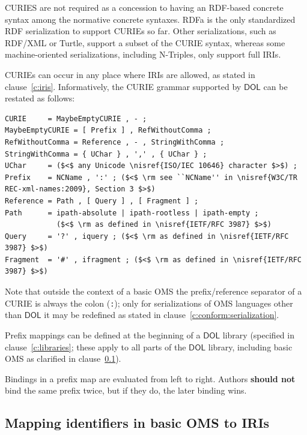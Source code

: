 \documentclass[10pt,fleqn,final]{scrreprt}
\newcommand{\cbs}[0]{\color{red}\xspace} %
\newcommand{\cbe}[0]{\color{black}\xspace} %
\newcommand*{\syntax}[1]{\texttt{#1}}
\newcommand*{\shouldnot}{\textbf{should not}\xspace}
\newcommand*{\DOL}{\ensuremath{\mathsf{DOL}}\xspace}
\newcommand{\clauserefname}{clause}
\newcommand{\cref}[1]{\clauserefname~\ref{#1}}
\newcommand{\ssclause}[1]{\subsection{#1}}
\newcommand{\nisref}[1]{#1}
\newenvironment{definitions}[0]{\medskip }{}
\begin{document}
\begin{definitions}
{CURIES are not required as 
a concession to having an RDF-based concrete syntax among the normative concrete syntaxes.  RDFa is 
the only standardized RDF serialization to support CURIEs so far.  Other serializations, such as 
RDF/XML or Turtle, support a subset of the CURIE syntax, whereas some machine-oriented 
serializations, including N-Triples, only support full IRIs.}

CURIEs can occur in any place where IRIs are allowed, as stated in \cref{c:iris}.  Informatively,\cbs 
the CURIE grammar supported by \DOL can be restated\cbe as follows:
\begin{lstlisting}[language=ebnf,escapeinside={()}]
CURIE     = MaybeEmptyCURIE , - ;
MaybeEmptyCURIE = [ Prefix ] , RefWithoutComma ;
RefWithoutComma = Reference , - , StringWithComma ;
StringWithComma = { UChar } , ',' , { UChar } ;
UChar     = ($<$ any Unicode \nisref{ISO/IEC 10646} character $>$) ;
Prefix    = NCName , ':' ; ($<$ \rm see ``NCName'' in \nisref{W3C/TR REC-xml-names:2009}, Section 3 $>$)
Reference = Path , [ Query ] , [ Fragment ] ;
Path      = ipath-absolute | ipath-rootless | ipath-empty ;
            ($<$ \rm as defined in \nisref{IETF/RFC 3987} $>$)
Query     = '?' , iquery ; ($<$ \rm as defined in \nisref{IETF/RFC 3987} $>$)
Fragment  = '#' , ifragment ; ($<$ \rm as defined in \nisref{IETF/RFC 3987} $>$) 
\end{lstlisting}

Note that outside the context of a basic OMS the prefix/reference separator of a CURIE is always the colon (\syntax{:}); only for serializations of OMS languages other than \DOL it may be redefined as stated in \cref{c:conform:serialization}.

Prefix mappings can be defined at the beginning of a \DOL library (specified in \cref{c:libraries}; 
these apply to all parts of the \DOL library, including basic OMS as clarified in \cref{c:map-ids}).  

Bindings in a prefix map are evaluated from left to right.  Authors \shouldnot bind the same prefix twice, but if they do, the later binding wins.

\ssclause{Mapping identifiers in basic OMS to IRIs}\label{c:map-ids}


\end{definitions}
\end{document}
